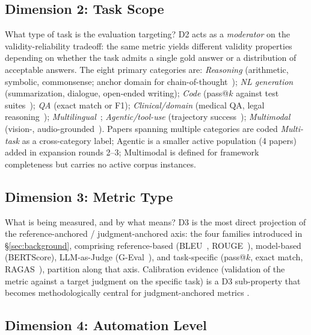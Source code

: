 \documentclass[acmsmall, nonacm, screen]{acmart}
\begin{document}
\subsection{Dimension 2: Task Scope}
\label{subsec:d2}

What type of task is the evaluation targeting? D2 acts as a
\emph{moderator} on the validity-reliability tradeoff: the same
metric yields different validity properties depending on whether the
task admits a single gold answer or a distribution of acceptable
answers. The eight primary categories are: \emph{Reasoning}
(arithmetic, symbolic, commonsense; anchor domain for
chain-of-thought~\cite{wei2022chain}); \emph{NL generation}
(summarization, dialogue, open-ended writing); \emph{Code}
(pass@$k$ against test suites~\cite{scoT2023}); \emph{QA}
(exact match or F1); \emph{Clinical/domain}
(medical QA, legal reasoning~\cite{clinicalnlp2024});
\emph{Multilingual}~\cite{vatsal2024survey}; \emph{Agentic/tool-use}
(trajectory success~\cite{yao2024taubench}); \emph{Multimodal}
(vision-, audio-grounded~\cite{fu2023mme}).
Papers spanning multiple categories are coded \emph{Multi-task}
as a cross-category label; Agentic is a smaller active population
(4 papers) added in expansion rounds 2--3; Multimodal is defined
for framework completeness but carries no active corpus instances.

\subsection{Dimension 3: Metric Type}
\label{subsec:d3}

What is being measured, and by what means? D3 is the most direct
projection of the reference-anchored / judgment-anchored axis: the
four families introduced in §\ref{sec:background},
comprising reference-based (BLEU~\cite{papineni2002bleu},
ROUGE~\cite{lin2004rouge}), model-based (BERTScore), LLM-as-Judge
(G-Eval~\cite{liu2023geval}), and task-specific (pass@$k$, exact
match, RAGAS~\cite{rageval2024}), partition along that axis.
Calibration evidence (validation of the metric against a target
judgment on the specific task) is a D3 sub-property that becomes
methodologically central for judgment-anchored metrics
\cite{liu2023geval, gu2025llmjudge}.

\subsection{Dimension 4: Automation Level}
\label{subsec:d4}
\end{document}
